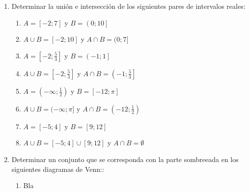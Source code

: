\documentclass[a4paper]{article}
\newcommand{\answer}{\item[**]}
\newcommand{\exercise}{\item}
\newcommand{\intersec}{\cap}
\newcommand{\union}{\cup}
\newcommand{\compl}[1]{\overline{#1}}
\newcommand{\df}[2]{\displaystyle\frac{#1}{#2}}
\begin{document}
\begin{enumerate}
\begin{multicols}{3}
\begin{enumerate} [label=(\alph*)]
		\item $(A \setminus B) \union C$
		\answer $\{2,3,4\}$

		\item $(A \union B) \setminus (C \intersec D)$
		\answer \{1,2,3,\{2,3\}\}

		\item $A \symdiff C$
		\answer $\{1,4\}$

		\item $\compl{A}$ considerando el universo $U=\mathbb{N}$
		\answer $\{ x \in \mathbb{N} ~|~ x \geq 4 \}= \{4,5,6,7,8,9,10,11, \cdots \}$

	\end{enumerate}
	\end{multicols}

	\exercise Determinar la unión e intersección de los siguientes pares de intervalos reales: 
	\begin{multicols}{3}
	\begin{enumerate} [label=(\alph*)]
		\item $A=\left[-2;7\right]$  y $B=\left(0;10\right]$
		\answer $A \union B = [-2;10]$ y $A \intersec B = (0;7]$

		\item $A=\left[-2;\df{5}{3}\right]$  y $B=\left(-1;1\right]$
		\answer $A \union B = \left[-2;\df{5}{3}\right]$ y $A \intersec B = \left(-1;\df{5}{3}\right]$

		\item $A=\left(-\infty;\df{1}{2}\right)$  y $B=\left[-12;\pi \right]$
		\answer $A \union B = (-\infty;\pi]$ y $A \intersec B = \left(-12;\df{1}{2}\right)$

		\item $A=\left[-5;4\right]$  y $B=\left[9;12\right]$
		\answer $A \union B = [-5;4] \union [9;12]$ y $A \intersec B = \emptyset$


	\end{enumerate}
	\end{multicols}

	\exercise Determinar un conjunto que se corresponda con la parte sombreeada en los siguientes diagramas de Venn:: 
	\begin{multicols}{3}
	\begin{enumerate} [label=(\alph*)]
		\item Bla

	\end{enumerate}
	\end{multicols}


\end{enumerate}
\end{document}
